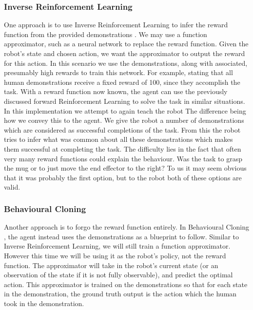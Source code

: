 \subsubsection{Inverse Reinforcement Learning}
One approach is to use Inverse Reinforcement Learning to infer the reward function from the provided demonstrations \cite{inverse-rl}. We may use a function approximator, such as a neural network to replace the reward function. Given the robot's state and chosen action, we want the approximator to output the reward for this action. In this scenario we use the demonstrations, along with associated, presumably high rewards to train this network. For example, stating that all human demonstrations receive a fixed reward of 100, since they accomplish the task. With a reward function now known, the agent can use the previously discussed forward Reinforcement Learning to solve the task in similar situations.\\

In this implementation we attempt to again teach the robot  The difference being how we convey this to the agent. We give the robot a number of demonstrations which are considered as successful completions of the task. From this the robot tries to infer what was common about all these demonstrations which makes them successful at completing the task. The difficulty lies in the fact that often very many reward functions could explain the behaviour. Was the task to grasp the mug or to just move the end effector to the right? To us it may seem obvious that it was probably the first option, but to the robot both of these options are valid.

\subsubsection{Behavioural Cloning}
Another approach is to forgo the reward function entirely. In Behavioural Cloning \cite{behavioural-cloning, behavioural-cloning-book}, the agent instead uses the demonstrations as a blueprint to follow. Similar to Inverse Reinforcement Learning, we will still train a function approximator. However this time we will be using it as the robot's policy, not the reward function. The approximator will take in the robot's current state (or an observation of the state if it is not fully observable), and predict the optimal action. This approximator is trained on the demonstrations so that for each state in the demonstration, the ground truth output is the action which the human took in the demonstration.\\

